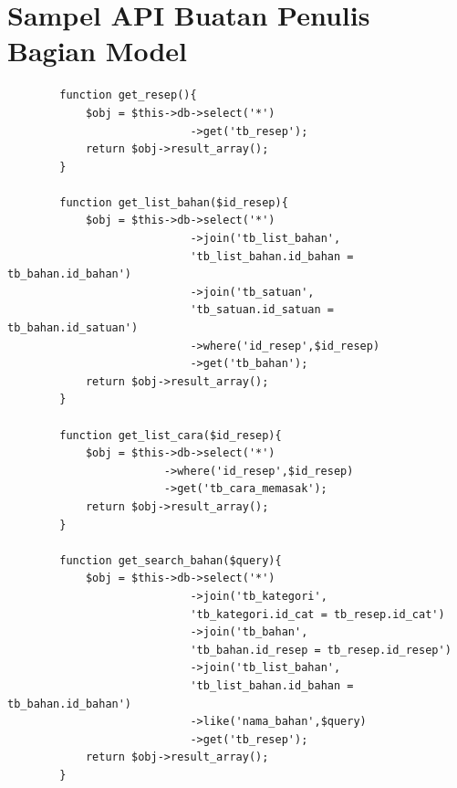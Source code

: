 \chapter{Sampel API Buatan Penulis Bagian Model}
	\begin{verbatim}
		function get_resep(){
			$obj = $this->db->select('*')
							->get('tb_resep');
			return $obj->result_array();
		}
		
		function get_list_bahan($id_resep){
			$obj = $this->db->select('*')
							->join('tb_list_bahan',
							'tb_list_bahan.id_bahan = tb_bahan.id_bahan')
							->join('tb_satuan',
							'tb_satuan.id_satuan = tb_bahan.id_satuan')
							->where('id_resep',$id_resep)
							->get('tb_bahan');
			return $obj->result_array();
		}
		
		function get_list_cara($id_resep){
			$obj = $this->db->select('*')
						->where('id_resep',$id_resep)
						->get('tb_cara_memasak');
			return $obj->result_array();
		}
		
		function get_search_bahan($query){
			$obj = $this->db->select('*')
							->join('tb_kategori',
							'tb_kategori.id_cat = tb_resep.id_cat')
							->join('tb_bahan',
							'tb_bahan.id_resep = tb_resep.id_resep')
							->join('tb_list_bahan',
							'tb_list_bahan.id_bahan = tb_bahan.id_bahan')
							->like('nama_bahan',$query)
							->get('tb_resep');
			return $obj->result_array();
		}
		
	\end{verbatim}	
